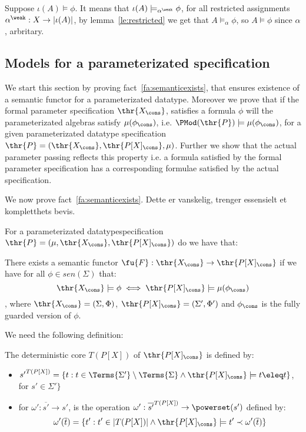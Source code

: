 \begin{PROOF}
Suppose $\iota(A) \models
\phi$. It means that $\iota(A) \models_{\alpha^{\weak}} \phi$,
for all restricted assignments $\alpha^{\weak}:X \to |\iota(A)|$, by
lemma~\ref{le:restricted} we get that $A \models_{\alpha} \phi$, so $A
\models \phi$ since $\alpha$, arbritary.
\end{PROOF}


\subsection{Models for a parameterizated specification}
\label{subse:paramodlogic}

We start this section by proving fact~\ref{fa:semanticexists}, that ensures existence of a semantic functor for a parameterizated datatype.
Moreover we prove that if the formal parameter specification $\thr{X_\cons}$, satisfies  a formula $\phi$ will the parameterizated algebras satisfy $\mu(\phi_\cons)$, i.e. $\PMod(\thr{P}) \models \mu(\phi_\cons)$, for a given parameterizated datatype specification $\thr{P}=(\thr{X_\cons}, \thr{P[X]_\cons}, \mu)$. Further we show that the actual parameter passing reflects this property i.e. a formula satisfied by the formal parameter specification has a corresponding formulae satisfied by the actual specification. 


We now prove fact~\ref{fa:semanticexists}.
Dette er vanskelig, trenger essensielt et kompletthets bevis.




\begin{fact}
For a parameterizated datatypespecification $\thr{P} = (\mu,\thr{X_\cons},\thr{P[X]_\cons})$ do we have that:

There exists a semantic functor $\fu{F}: \thr{X_\cons} \to \thr{P[X]_\cons}$ if we have for all $\phi \in sen(\Sigma)$ that:
	\[ \thr{X_\cons}\models \phi \iff \thr{P[X]_\cons} \models \mu(\phi_\cons )\]
, where $\thr{X_\cons}=(\Sigma,\Phi)$, $\thr{P[X]_\cons}=(\Sigma',\Phi')$ and $\phi_\cons$ is the fully guarded version of $\phi$.
\end{fact}

We need the following definition:
\begin{definition}
The deterministic core $T(P[X])$ of $\thr{P[X]_\cons}$ is defined by:
	\begin{itemize}
	\item ${s'}^{T(P[X])} =\{ t: t \in \Terms{\Sigma'} \setminus \Terms{\Sigma} \land \thr{P[X]_\cons} \models t \eleq t \}$, for $s' \in \Sigma' \}$
	\item for $\omega': \overline{s'} \to s'$, is the operation $\omega': \overline{s'}^{T(P[X])} \to \powerset(s')$ defined by:
		\[ \omega'(\overline{t})= \{ t' : t' \in |T(P[X])| \land \thr{P[X]_\cons} \models t' \prec \omega'(\overline{t}) \}  \]
	\end{itemize}
\end{definition}



